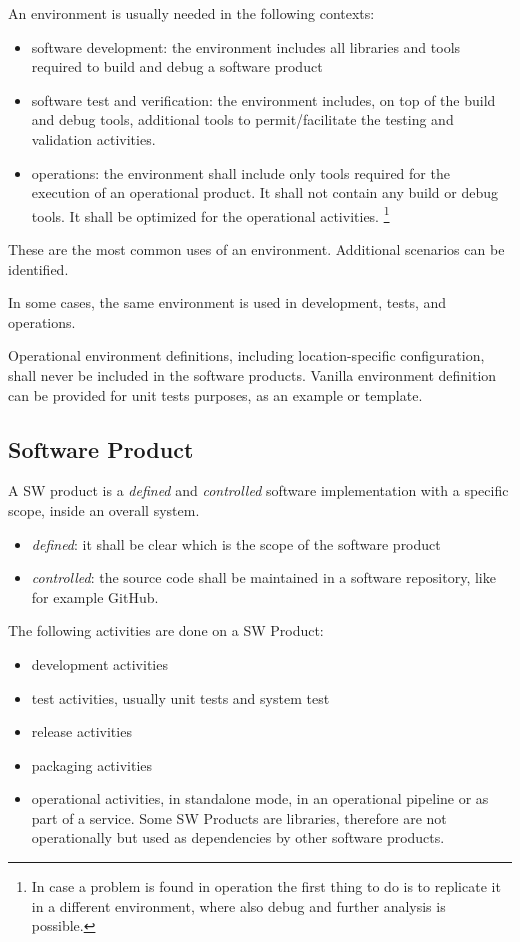 An environment is usually needed in the following contexts:

\begin{itemize}
\item software development: the environment includes all libraries and tools required to build and debug a software product
\item software test and verification: the environment includes, on top of the build and debug tools, additional tools to permit/facilitate the testing and validation activities.
\item operations: the environment shall include only tools required for the execution of an operational product. It shall not contain any build or debug tools. It shall be optimized for the operational activities. \footnote{In case a problem is found in operation the first thing to do is to replicate it in a different environment, where also debug and further analysis is possible.}
\end{itemize}

These are the most common uses of an environment. Additional scenarios can be identified.

In some cases, the same environment is used in development, tests, and operations.

Operational environment definitions, including location-specific configuration, shall never be included in the software products.
Vanilla environment definition can be provided for unit tests purposes, as an example or template.


\subsection{Software Product} \label{sec:swprod}

A SW product is a \textit{defined} and \textit{controlled} software implementation with a specific scope, inside an overall system.

\begin{itemize}
\item \textit{defined}: it shall be clear which is the scope of the software product
\item \textit{controlled}: the source code shall be maintained in a software repository, like for example GitHub.
\end{itemize}


The following activities are done on a SW Product:
\begin{itemize}
\item development activities
\item test activities, usually unit tests and system test
\item release activities
\item packaging activities
\item operational activities, in standalone mode, in an operational pipeline or as part of a service. 
Some SW Products are libraries, therefore are not operationally but used as dependencies by other software products.
\end{itemize}

